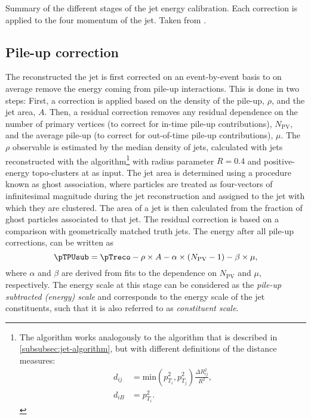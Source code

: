 \begin{table}
    \caption{Summary of the different stages of the jet energy calibration. Each correction is applied to the four momentum of the jet. Taken from .}
    \label{tab:jes-calibration}
\end{table}

\subsection{Pile-up correction}
\label{subsec:pile-up-correction}
The reconstructed the jet \pT is first corrected on an event-by-event basis to on average remove the energy coming from pile-up interactions. This is done in two steps: First, a correction is applied based on the \pT density of the pile-up, $\rho$, and the jet area, $A$. Then, a residual correction removes any residual \pT dependence on the number of primary vertices (to correct for in-time pile-up contributions), $N_\text{PV}$, and the average pile-up (to correct for out-of-time pile-up contributions), $\mu$.
The $\rho$ observable is estimated by the median \pT density of jets, calculated with jets reconstructed with the \kt algorithm\footnote{The \kt algorithm works analogously to the \antikt algorithm that is described in \cref{subsubsec:jet-algorithm}, but with different definitions of the distance measures:
    \begin{align*}
        d_{ij} & = \text{min}\left(p_{T_i}^2,p_{T_j}^2\right) \frac{\Delta R_{ij}^2}{R^2}, \\
        d_{iB} & = p_{T_i}^2.
        \label{eq:kt-distances}
    \end{align*}
}
with radius parameter $R = 0.4$ and positive-energy topo-clusters at  as input. The jet area is determined using a procedure known as ghost association, where particles are treated as four-vectors of infinitesimal magnitude during the jet reconstruction and assigned to the jet with which they are clustered. The area of a jet is then calculated from the fraction of ghost particles associated to that jet.
The residual correction is based on a comparison with geometrically matched truth jets. The energy after all pile-up corrections, can be written as
\begin{equation}
    \label{eq:pTpusub}
    \pTPUsub = \pTreco - \rho \times A - \alpha \times \left( N_{\text{PV}} - 1\right) - \beta \times \mu,
\end{equation}
where $\alpha$ and $\beta$ are derived from fits to the \pT dependence on $N_{\text{PV}}$ and $\mu$, respectively.
The energy scale at this stage can be considered as the \emph{pile-up subtracted (energy) scale} and corresponds to the energy scale of the jet constituents, such that it is also referred to as \emph{constituent scale}.

